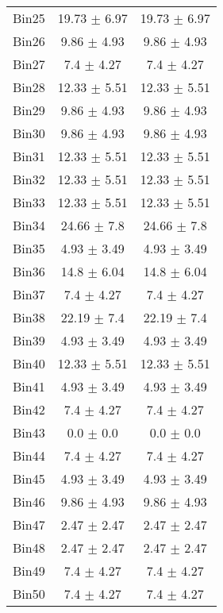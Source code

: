 \begin{tabular}{|c|c|c|}
     Bin25 & 19.73 $\pm$ 6.97 & 19.73 $\pm$ 6.97 \\ \cline{1-3} 
     Bin26 & 9.86 $\pm$ 4.93 & 9.86 $\pm$ 4.93 \\ \cline{1-3} 
     Bin27 & 7.4 $\pm$ 4.27 & 7.4 $\pm$ 4.27 \\ \cline{1-3} 
     Bin28 & 12.33 $\pm$ 5.51 & 12.33 $\pm$ 5.51 \\ \cline{1-3} 
     Bin29 & 9.86 $\pm$ 4.93 & 9.86 $\pm$ 4.93 \\ \cline{1-3} 
     Bin30 & 9.86 $\pm$ 4.93 & 9.86 $\pm$ 4.93 \\ \cline{1-3} 
     Bin31 & 12.33 $\pm$ 5.51 & 12.33 $\pm$ 5.51 \\ \cline{1-3} 
     Bin32 & 12.33 $\pm$ 5.51 & 12.33 $\pm$ 5.51 \\ \cline{1-3} 
     Bin33 & 12.33 $\pm$ 5.51 & 12.33 $\pm$ 5.51 \\ \cline{1-3} 
     Bin34 & 24.66 $\pm$ 7.8 & 24.66 $\pm$ 7.8 \\ \cline{1-3} 
     Bin35 & 4.93 $\pm$ 3.49 & 4.93 $\pm$ 3.49 \\ \cline{1-3} 
     Bin36 & 14.8 $\pm$ 6.04 & 14.8 $\pm$ 6.04 \\ \cline{1-3} 
     Bin37 & 7.4 $\pm$ 4.27 & 7.4 $\pm$ 4.27 \\ \cline{1-3} 
     Bin38 & 22.19 $\pm$ 7.4 & 22.19 $\pm$ 7.4 \\ \cline{1-3} 
     Bin39 & 4.93 $\pm$ 3.49 & 4.93 $\pm$ 3.49 \\ \cline{1-3} 
     Bin40 & 12.33 $\pm$ 5.51 & 12.33 $\pm$ 5.51 \\ \cline{1-3} 
     Bin41 & 4.93 $\pm$ 3.49 & 4.93 $\pm$ 3.49 \\ \cline{1-3} 
     Bin42 & 7.4 $\pm$ 4.27 & 7.4 $\pm$ 4.27 \\ \cline{1-3} 
     Bin43 & 0.0 $\pm$ 0.0 & 0.0 $\pm$ 0.0 \\ \cline{1-3} 
     Bin44 & 7.4 $\pm$ 4.27 & 7.4 $\pm$ 4.27 \\ \cline{1-3} 
     Bin45 & 4.93 $\pm$ 3.49 & 4.93 $\pm$ 3.49 \\ \cline{1-3} 
     Bin46 & 9.86 $\pm$ 4.93 & 9.86 $\pm$ 4.93 \\ \cline{1-3} 
     Bin47 & 2.47 $\pm$ 2.47 & 2.47 $\pm$ 2.47 \\ \cline{1-3} 
     Bin48 & 2.47 $\pm$ 2.47 & 2.47 $\pm$ 2.47 \\ \cline{1-3} 
     Bin49 & 7.4 $\pm$ 4.27 & 7.4 $\pm$ 4.27 \\ \cline{1-3} 
     Bin50 & 7.4 $\pm$ 4.27 & 7.4 $\pm$ 4.27 \\ \cline{1-3} 

\end{tabular}

